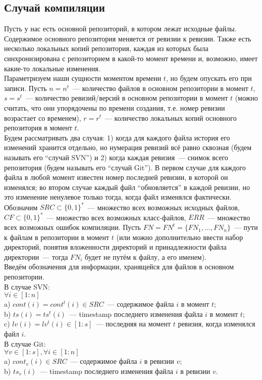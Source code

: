 \subsection{Случай компиляции}

Пусть у нас есть основной репозиторий, в котором лежат исходные файлы. Содержимое основного репозитория меняется от ревизии к ревизии. Также есть несколько локальных копий репозитория, каждая из которых была синхронизирована с репозиторием в какой-то момент времени и, возможно, имеет какие-то локальные изменения.\\

Параметризуем наши сущности моментом времени $t$, но будем опускать его при записи. Пусть $n = n^t$~--- количество файлов в основном репозитории в момент  $t$, $s = s^t$~--- количество ревизий/версий в основном репозитории в момент $t$ (можно считать, что они упорядочены по времени создания, т.е. номер ревизии возрастает со временем), $r = r^t$~--- количество локальных копий основного репозитория в момент $t$.\\

Будем рассматривать два случая: 1) когда для каждого файла история его изменений хранится отдельно, но нумерация ревизий всё равно сквозная (будем называть его ``случай SVN'') и 2) когда каждая ревизия~--- снимок всего репозитория (будем называть его ``случай Git''). В первом случае для каждого файла в любой момент известен номер последней ревизии, в которой он изменялся; во втором случае каждый файл ``обновляется'' в каждой ревизии, но это изменение ненулевое только тогда, когда файл изменялся фактически.\\

Обозначим $SRC \subset \{0,1\}^*$~--- множество всех возможных исходных файлов, $CF \subset \{0,1\}^*$~--- множество всех возможных класс-файлов, $ERR$~--- множество всех возможных ошибок компиляции.
Пусть $FN = FN^t = \{FN_1, \dots, FN_n\}$~--- пути к файлам в репозитории в момент $t$ (или можно дополнительно ввести набор директорий, понятия вложенности директорий и принадлежности файла директории~--- тогда $FN_i$ будет не путём к файлу, а его именем).\\

Введём обозначения для информации, хранящейся для файлов в основном репозитории.\\
В случае SVN:\\
$\forall i \in [1:n]$\\
\indent a) $cont(i) = cont^t(i) \in SRC$~--- содержимое файла $i$ в момент $t$;\\
\indent b) $ts(i) = ts^t(i)$~--- timestamp последнего изменения файла $i$ в момент $t$;\\
\indent c) $lv(i) = lv^t(i) \in [1:s]$~--- последняя на момент $t$ ревизия, когда изменялся файл $i$.\\
В случае Git:\\
$\forall v \in [1:s], \forall i \in [1:n]$\\
\indent a) $cont_v(i) \in SRC$~--- содержимое файла $i$ в ревизии $v$;\\
\indent b) $ts_v(i)$~--- timestamp последнего изменения файла $i$ в ревизии $v$.\\


